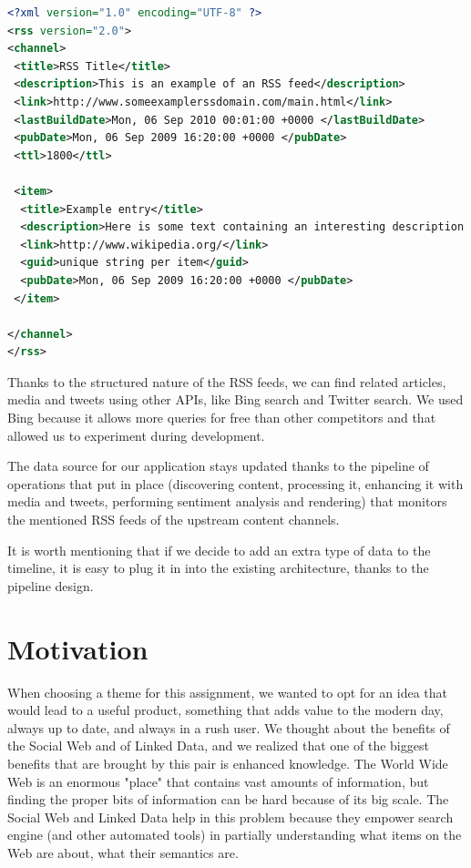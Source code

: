 \documentclass{acm_proc_10ptArticle-sp}
\begin{document}
\begin{minipage}{\linewidth}
\begin{lstlisting}[language=XML, frame=single, caption=Example RSS feed, breaklines=true, captionpos=b]
<?xml version="1.0" encoding="UTF-8" ?>
<rss version="2.0">
<channel>
 <title>RSS Title</title>
 <description>This is an example of an RSS feed</description>
 <link>http://www.someexamplerssdomain.com/main.html</link>
 <lastBuildDate>Mon, 06 Sep 2010 00:01:00 +0000 </lastBuildDate>
 <pubDate>Mon, 06 Sep 2009 16:20:00 +0000 </pubDate>
 <ttl>1800</ttl>
 
 <item>
  <title>Example entry</title>
  <description>Here is some text containing an interesting description.</description>
  <link>http://www.wikipedia.org/</link>
  <guid>unique string per item</guid>
  <pubDate>Mon, 06 Sep 2009 16:20:00 +0000 </pubDate>
 </item>
 
</channel>
</rss>
\end{lstlisting}
\end{minipage}


Thanks to the structured nature of the RSS feeds, we can find related articles, media and tweets using other APIs, like Bing search and Twitter search. We used Bing because it allows more queries for free than other competitors and that allowed us to experiment during development.

The data source for our application stays updated thanks to the pipeline of operations that put in place (discovering content, processing it, enhancing it with media and tweets, performing sentiment analysis and rendering) that monitors the mentioned RSS feeds of the upstream content channels.

It is worth mentioning that if we decide to add an extra type of data to the timeline, it is easy to plug it in into the existing architecture, thanks to the pipeline design.

\section{Motivation}

When choosing a theme for this assignment, we wanted to opt for an idea that would lead to a useful product, something that adds value to the modern day, always up to date, and always in a rush user. We thought about the benefits of the Social Web and of Linked Data, and we realized that one of the biggest benefits that are brought by this pair is enhanced knowledge. The World Wide Web is an enormous "place" that contains vast amounts of information, but finding the proper bits of information can be hard because of its big scale. The Social Web and Linked Data help in this problem because they empower search engine (and other automated tools) in partially understanding what items on the Web are about, what their semantics are.
\end{document}
